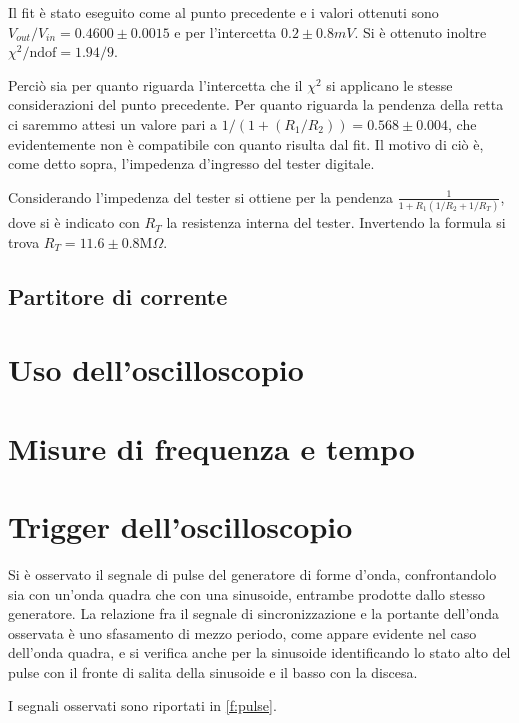 \documentclass[10pt,a4paper]{article}
\begin{document}
Il fit è stato eseguito come al punto precedente e i valori ottenuti sono $V_{out}/V_{in} = 0.4600 \pm 0.0015$ e per l'intercetta $0.2 \pm 0.8 mV$. Si è ottenuto inoltre $\chi^2 / \text{ndof} = 1.94 / 9$.

Perciò sia per quanto riguarda l'intercetta che il $\chi^2$ si applicano le stesse considerazioni del punto precedente. Per quanto riguarda la pendenza della retta ci saremmo attesi un valore pari a  $1/(1+(R_1/R_2))=0.568 \pm 0.004$, che evidentemente non è compatibile con quanto risulta dal fit. Il motivo di ciò è, come detto sopra, l'impedenza d'ingresso del tester digitale.

Considerando l'impedenza del tester si ottiene per la pendenza $\frac{1}{1 + R_1 (1/R_2 + 1/R_T)}$, dove si è indicato con $R_T$ la resistenza interna del tester. Invertendo la formula si trova $R_T = 11.6 \pm 0.8 \text{M}\Omega$.

\subsection{Partitore di corrente}


\section{Uso dell'oscilloscopio}

\section{Misure di frequenza e tempo}

\section{Trigger dell'oscilloscopio}
Si è osservato il segnale di pulse del generatore di forme d'onda, confrontandolo sia con un'onda quadra che con una sinusoide, entrambe prodotte dallo stesso generatore.
La relazione fra il segnale di sincronizzazione e la portante dell'onda osservata è uno sfasamento di mezzo periodo, come appare evidente nel caso dell'onda quadra, e si verifica anche per la sinusoide identificando lo stato alto del pulse con il fronte di salita della sinusoide e il basso con la discesa.

I segnali osservati sono riportati in \figurename{\ref{f:pulse}}.
	
\end{document}
